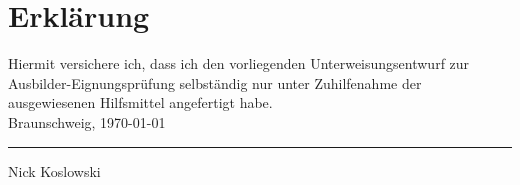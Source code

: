 \chapter*{Erklärung}
\thispagestyle{empty}

   \vspace*{2,5cm}
Hiermit versichere ich, dass ich den vorliegenden Unterweisungsentwurf zur Ausbilder-Eignungsprüfung selbständig nur unter Zuhilfenahme der ausgewiesenen Hilfsmittel angefertigt habe.
   \vspace*{3em}\\
     Braunschweig, \today \hfill \parbox[t]{5cm}{\centering\hrule\medskip Nick Koslowski}